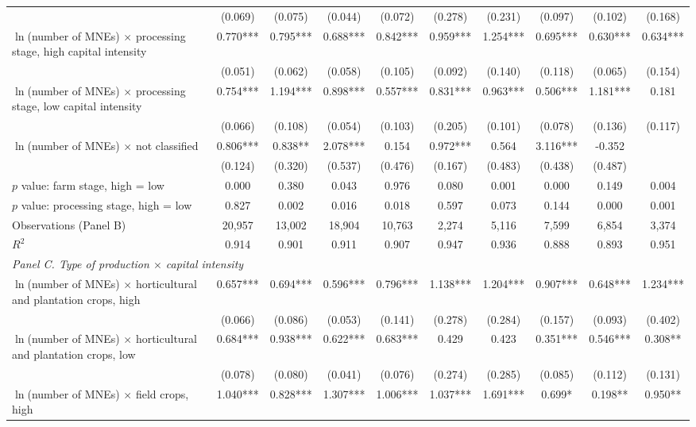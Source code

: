 \begin{tabular}{l*{9}{c}}
 & (0.069) & (0.075) & (0.044) & (0.072) & (0.278) & (0.231) & (0.097) & (0.102) & (0.168) \\
$\ln$(number of MNEs) $\times$ processing stage, high capital intensity & 0.770*** & 0.795*** & 0.688*** & 0.842*** & 0.959*** & 1.254*** & 0.695*** & 0.630*** & 0.634*** \\
 & (0.051) & (0.062) & (0.058) & (0.105) & (0.092) & (0.140) & (0.118) & (0.065) & (0.154) \\
$\ln$(number of MNEs) $\times$ processing stage, low capital intensity & 0.754*** & 1.194*** & 0.898*** & 0.557*** & 0.831*** & 0.963*** & 0.506*** & 1.181*** & 0.181 \\
 & (0.066) & (0.108) & (0.054) & (0.103) & (0.205) & (0.101) & (0.078) & (0.136) & (0.117) \\
$\ln$(number of MNEs) $\times$ not classified & 0.806*** & 0.838** & 2.078*** & 0.154 & 0.972*** & 0.564 & 3.116*** & -0.352 &  \\
 & (0.124) & (0.320) & (0.537) & (0.476) & (0.167) & (0.483) & (0.438) & (0.487) &  \\
$p$ value: farm stage, high = low & 0.000 & 0.380 & 0.043 & 0.976 & 0.080 & 0.001 & 0.000 & 0.149 & 0.004 \\
$p$ value: processing stage, high = low & 0.827 & 0.002 & 0.016 & 0.018 & 0.597 & 0.073 & 0.144 & 0.000 & 0.001 \\
Observations (Panel B) & 20,957 & 13,002 & 18,904 & 10,763 & 2,274 & 5,116 & 7,599 & 6,854 & 3,374 \\
$R^2$ & 0.914 & 0.901 & 0.911 & 0.907 & 0.947 & 0.936 & 0.888 & 0.893 & 0.951 \\
\midrule
\multicolumn{10}{l}{\textit{Panel C. Type of production $\times$ capital intensity}} \\
$\ln$(number of MNEs) $\times$ horticultural and plantation crops, high & 0.657*** & 0.694*** & 0.596*** & 0.796*** & 1.138*** & 1.204*** & 0.907*** & 0.648*** & 1.234*** \\
 & (0.066) & (0.086) & (0.053) & (0.141) & (0.278) & (0.284) & (0.157) & (0.093) & (0.402) \\
$\ln$(number of MNEs) $\times$ horticultural and plantation crops, low & 0.684*** & 0.938*** & 0.622*** & 0.683*** & 0.429 & 0.423 & 0.351*** & 0.546*** & 0.308** \\
 & (0.078) & (0.080) & (0.041) & (0.076) & (0.274) & (0.285) & (0.085) & (0.112) & (0.131) \\
$\ln$(number of MNEs) $\times$ field crops, high & 1.040*** & 0.828*** & 1.307*** & 1.006*** & 1.037*** & 1.691*** & 0.699* & 0.198** & 0.950** \\

\end{tabular}
